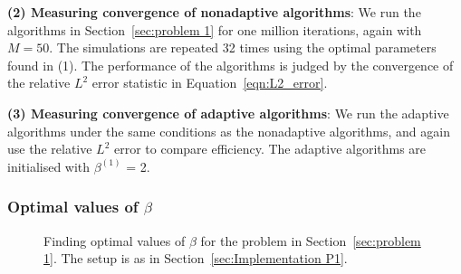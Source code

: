 \documentclass[final]{siamltex}
\begin{document}
{\bf (2) Measuring convergence of nonadaptive algorithms}: We run the algorithms in Section~\ref{sec:problem 1} for one million iterations, again with $M=50$. The simulations are repeated 32 times using the optimal parameters found in (1). The performance of the algorithms is judged by the convergence of the relative $L^2$ error statistic in Equation~\ref{eqn:L2_error}.

{\bf (3) Measuring convergence of adaptive algorithms}: We run the
adaptive algorithms under the same conditions as the nonadaptive
algorithms, and again use the relative $L^2$ error to compare
efficiency. The adaptive algorithms are initialised with $\beta^{(1)}$ = 2.


\subsubsection{Optimal values of $\beta$}\label{sec:Optimal values P1}

\begin{figure}[htb]
\centering
{}
\caption{Finding optimal values of $\beta$ for the problem in Section~\ref{sec:problem 1}. The setup is as in Section~\ref{sec:Implementation P1}.}
\label{fig:P1 opt beta}
\end{figure}
\end{document}
